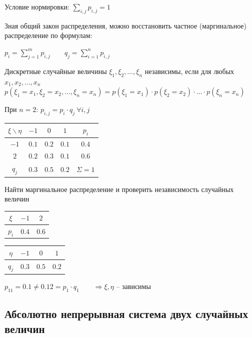 \documentclass[12pt]{article}
\begin{document}
    Условие нормировки: $\sum_{i, j} p_{i, j} = 1$

    Зная общий закон распределения, можно восстановить частное (маргинальное) распределение по формулам: 

    $p_i = \sum_{j = 1}^m p_{i, j} \qquad q_j = \sum_{i = 1}^n p_{i, j}$

    \Def Дискретные случайные величины $\xi_1, \xi_2, \dots, \xi_n$ независимы, если для любых $x_1, x_2, \dots, x_n$ 
    $p(\xi_1 = x_1, \xi_2 = x_2, \dots, \xi_n = x_n) = p(\xi_1 = x_1) \cdot p(\xi_2 = x_2) \cdot \dots \cdot p(\xi_n = x_n)$

    При $n = 2$: $p_{i, j} = p_i \cdot q_j \ \forall i, j$

    \Ex

    \begin{tabular}{c|c|c|c|c}
        $\xi \backslash \eta$ & $-1$ & $0$ & $1$ & $p_i$ \\
        \hline
        $-1$ & $0.1$ & $0.2$ & $0.1$ & $0.4$ \\
        \hline
        $2$ & $0.2$ & $0.3$ & $0.1$ & $0.6$ \\
        \hline
        $q_j$ & $0.3$ & $0.5$ & $0.2$ & $\Sigma = 1$ \\
    \end{tabular}

    Найти маргинальное распределение и проверить независимость случайных величин


    \begin{tabular}{c|c|c}
        $\xi$ & $-1$ & $2$ \\
        \hline
        $p_i$ & $0.4$ & $0.6$  \\
    \end{tabular}

    \begin{tabular}{c|c|c|c}
        $\eta$ & $-1$ & $0$ & $1$ \\
        \hline
        $q_j$ & $0.3$ & $0.5$ & $0.2$  \\
    \end{tabular}

    $p_{11} = 0.1 \neq 0.12 = p_1 \cdot q_1 \qquad \Longrightarrow \xi, \eta$ -- зависимы

    \hypertarget{continuoussystemoftwovariables}{}

    \subsection{Абсолютно непрерывная система двух случайных величин}
\end{document}
